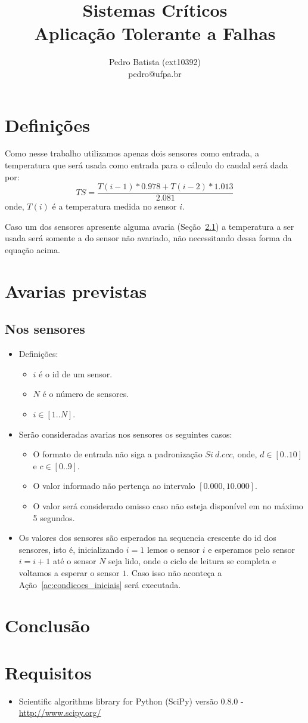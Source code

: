 \documentclass[a4paper,12pt]{article}
\title{Sistemas Críticos\\[10pt]
\Large{Aplicação Tolerante a Falhas}}
\author{Pedro Batista (ext10392)\\
pedro@ufpa.br}
\begin{document}
\maketitle

\section{Definições}
Como nesse trabalho utilizamos apenas dois sensores como entrada, a temperatura
que será usada como entrada para o cálculo do caudal será dada por:
$$TS=\frac{T(i-1)*0.978+T(i-2)*1.013}{2.081}$$
onde,
$T(i)$ é a temperatura medida no sensor $i$.

Caso um dos sensores apresente alguma avaria (Seção~\ref{sec:av_sensor}) a
temperatura a ser usada será somente a do sensor não avariado, não necessitando
dessa forma da equação acima.

\section{Avarias previstas}

\subsection{Nos sensores}\label{sec:av_sensor}
\begin{itemize}
	\item Definições:
		\begin{itemize}
			\item $i$ é o id de um sensor.
			\item $N$ é o número de sensores.
			\item $i\in[1..N]$.
		\end{itemize}
	\item Serão consideradas avarias nos sensores os seguintes casos:
	\begin{itemize}
		\item O formato de entrada não siga a padronização $Si~d.ccc$,
			onde, $d\in[0..10]$ e $c\in[0..9]$.
		\item O valor informado não pertença ao intervalo
			$[0.000,10.000]$.
		\item O valor será considerado omisso caso não esteja disponível em no máximo
			5 segundos.
	\end{itemize}
	\item Os valores dos sensores são esperados na sequencia crescente do id
		dos sensores, isto é, inicializando $i=1$ lemos o sensor $i$ e esperamos
		pelo sensor $i=i+1$ até o sensor $N$ seja lido, onde o ciclo de
		leitura se completa e voltamos a esperar o sensor $1$. Caso isso não aconteça a
		Ação~\ref{ac:condicoes_iniciais} será executada.
\end{itemize}

\section{Conclusão}

\section{Requisitos}

\begin{itemize}
	\item Scientific algorithms library for Python (SciPy) versão 0.8.0 -
		\url{http://www.scipy.org/}
\end{itemize}
\end{document}

